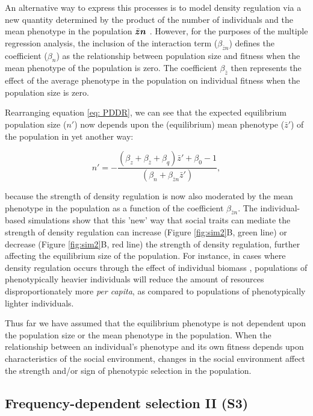 \documentclass{article}
\begin{document}
An alternative way to express this processes  is to model density regulation via a new quantity determined by the product of the number of individuals and the mean phenotype in the population $\bar{\vectorsym{z}}\vectorsym{n}$ \citep{Engen2020}. However, for the purposes of the multiple regression analysis, the inclusion of the interaction term ($\beta_{\bar{z}n}$) defines the coefficient ($\beta_{n}$) as the relationship between population size and fitness when the mean phenotype of the population is zero. The coefficient $ \beta_{\bar{z}}$ then represents the effect of the average phenotype in the population on individual fitness when the population size is zero. 

Rearranging equation \ref{eq: PDDR}, we can see that the expected equilibrium population size ($n'$) now depends upon the (equilibrium) mean phenotype ($\bar{z}'$) of the population in yet another way:

\begin{equation}
n' = -\frac{(\beta_{z}  + \beta_{\bar{z}} + \beta_{q})\bar{z}'+\beta_{0} -1}{(\beta_{n} +  \beta_{\bar{z}n} \bar{z}')},
\end{equation}

\noindent because the strength of density regulation is now also moderated by the mean phenotype in the population as a function of the coefficient  $\beta_{\bar{z}n}$. The individual-based simulations show that this 'new' way that social traits can mediate the strength of density regulation can increase (Figure \ref{fig:sim2}B, green line) or decrease (Figure \ref{fig:sim2}B, red line) the strength of density regulation, further affecting the equilibrium size of the population. For instance, in cases where density regulation occurs through the effect of individual biomass \citep{Owen-Smith2002}, populations of phenotypically heavier individuals will reduce the amount of resources disproportionately more \textit{per capita}, as compared to populations of phenotypically lighter individuals.

Thus far we have assumed that the equilibrium phenotype is not dependent upon the population size or the mean phenotype in the population. When the relationship between an individual's phenotype and its own fitness depends upon characteristics of the social environment, changes in the social environment affect the strength and/or sign of phenotypic selection in the population. 
 
 
\subsection{Frequency-dependent selection II (S3)}
\end{document}
